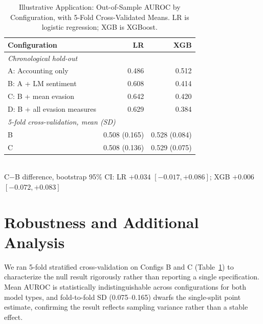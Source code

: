 \documentclass[conference]{IEEEtran}
\begin{document}
\begin{table}[t]
\centering
\caption{Illustrative Application: Out-of-Sample AUROC by Configuration, with 5-Fold Cross-Validated Means. LR is logistic regression; XGB is XGBoost.}
\label{tab:auroc}
\begin{tabular}{lrr}
\toprule
Configuration & LR & XGB \\
\midrule
\multicolumn{3}{l}{\emph{Chronological hold-out}} \\
A: Accounting only & 0.486 & 0.512 \\
B: A + LM sentiment & 0.608 & 0.414 \\
C: B + mean evasion & 0.642 & 0.420 \\
D: B + all evasion measures & 0.629 & 0.384 \\
\midrule
\multicolumn{3}{l}{\emph{5-fold cross-validation, mean (SD)}} \\
B & 0.508 (0.165) & 0.528 (0.084) \\
C & 0.508 (0.136) & 0.529 (0.075) \\
\bottomrule
\end{tabular}
\\[4pt]
\footnotesize C$-$B difference, bootstrap 95\% CI: LR $+0.034$ $[-0.017, +0.086]$; XGB $+0.006$ $[-0.072, +0.083]$
\end{table}

\section{Robustness and Additional Analysis}
\label{sec:robustness}

We ran 5-fold stratified cross-validation on Configs B and C (Table~\ref{tab:auroc}) to characterize the null result rigorously rather than reporting a single specification. Mean AUROC is statistically indistinguishable across configurations for both model types, and fold-to-fold SD (0.075--0.165) dwarfs the single-split point estimate, confirming the result reflects sampling variance rather than a stable effect.
\end{document}

